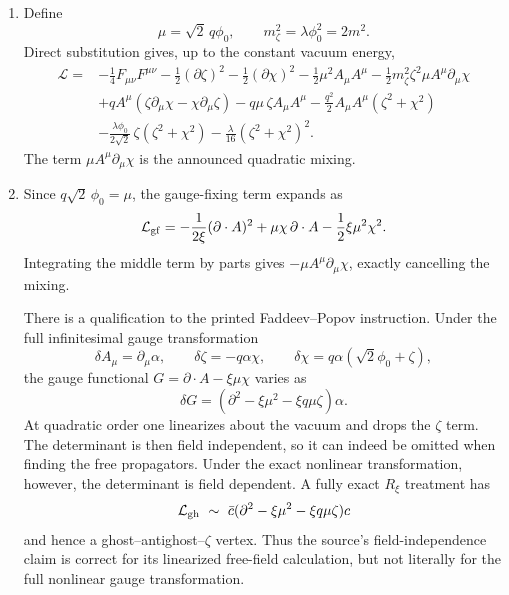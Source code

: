 \begin{enumerate}
  \begin{enumerate}
    \item[(a)]
    Define
    \[
      \mu=\sqrt2\,q\phi_0,\qquad
      m_\zeta^2=\lambda\phi_0^2=2m^2.
    \]
    Direct substitution gives, up to the constant vacuum energy,
    \[
      \begin{split}
      \mathcal L={}&-\frac14F_{\mu\nu}F^{\mu\nu}
       -\frac12(\partial\zeta)^2-\frac12(\partial\chi)^2
       -\frac12\mu^2A_\mu A^\mu-\frac12m_\zeta^2\zeta^2
       \mu A^\mu\partial_\mu\chi\\
      &+qA^\mu(\zeta\partial_\mu\chi-\chi\partial_\mu\zeta)
       -q\mu\,\zeta A_\mu A^\mu
       -\frac{q^2}{2}A_\mu A^\mu(\zeta^2+\chi^2)\\
      &-\frac{\lambda\phi_0}{2\sqrt2}\,
        \zeta(\zeta^2+\chi^2)
       -\frac{\lambda}{16}(\zeta^2+\chi^2)^2 .
      \end{split}
    \]
    The term
    \(\mu A^\mu\partial_\mu\chi\) is the announced quadratic mixing.

    \item[(b)]
    Since \(q\sqrt2\,\phi_0=\mu\), the gauge-fixing term expands as
    \[
      \mathcal L_{\rm gf}
       =-\frac1{2\xi}(\partial\cdot A)^2
        +\mu\chi\,\partial\cdot A
        -\frac12\xi\mu^2\chi^2.
    \]
    Integrating the middle term by parts gives
    \(-\mu A^\mu\partial_\mu\chi\), exactly cancelling the mixing.

    There is a qualification to the printed Faddeev--Popov instruction.
    Under the full infinitesimal gauge transformation
    \[
      \delta A_\mu=\partial_\mu\alpha,\qquad
      \delta\zeta=-q\alpha\chi,\qquad
      \delta\chi=q\alpha(\sqrt2\phi_0+\zeta),
    \]
    the gauge functional \(G=\partial\cdot A-\xi\mu\chi\) varies as
    \[
      \delta G=
        \left(\partial^2-\xi\mu^2-\xi q\mu\zeta\right)\alpha.
    \]
    At quadratic order one linearizes about the vacuum and drops the
    \(\zeta\) term.  The determinant is then field independent, so it can
    indeed be omitted when finding the free propagators.  Under the exact
    nonlinear transformation, however, the determinant is field
    dependent.  A fully exact \(R_\xi\) treatment has
    \[
      \mathcal L_{\rm gh}\ \sim\
        \bar c(\partial^2-\xi\mu^2-\xi q\mu\zeta)c
    \]
    and hence a ghost--antighost--\(\zeta\) vertex.  Thus the source's
    field-independence claim is correct for its linearized free-field
    calculation, but not literally for the full nonlinear gauge
    transformation.


\end{enumerate}
\end{enumerate}

